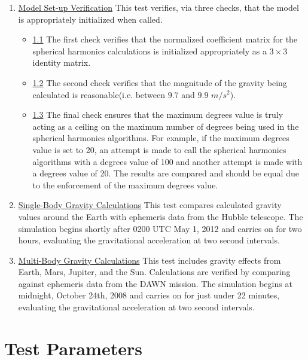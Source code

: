 \documentclass[]{BasiliskReportMemo}
\begin{document}
\begin{enumerate}
	\item \underline{Model Set-up Verification} This test verifies, via three checks, that the model is appropriately initialized when called. 
		\begin{itemize}
			\item \underline{1.1} The first check verifies that the normalized coefficient matrix for the spherical harmonics calculations is initialized appropriately as a $3\times3$ identity matrix. \\
			\item \underline{1.2} The second check verifies that the magnitude of the gravity being calculated is reasonable(i.e. between $9.7$ and $9.9$ $m/s^2$). \\
			\item \underline{1.3} The final check ensures that the maximum degrees value is truly acting as a ceiling on the maximum number of degrees being used in the spherical harmonics algorithms. For example, if the maximum degrees value is set to 20, an attempt is made to call the spherical harmonics algorithms with a degrees value of 100 and another attempt is made with a degrees value of 20. The results are compared and should be equal due to the enforcement of the maximum degrees value.\\
		\end{itemize}
	\item \underline{Single-Body Gravity Calculations} This test compares calculated gravity values around the Earth with ephemeris data from the Hubble telescope. The simulation begins shortly after 0200 UTC May 1, 2012 and carries on for two hours, evaluating the gravitational acceleration at two  second intervals.
	\item \underline{Multi-Body Gravity Calculations} This test includes gravity effects from Earth, Mars, Jupiter, and the Sun. Calculations are verified by comparing against ephemeris data from the DAWN mission. The simulation begins at midnight, October 24th, 2008 and carries on for just under 22 minutes, evaluating the gravitational acceleration at two second intervals.
\end{enumerate} 

\section{Test Parameters}
\end{document}
